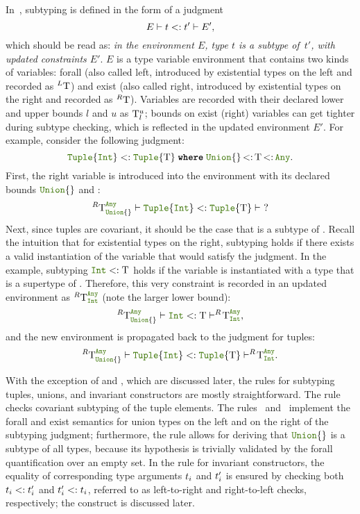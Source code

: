 In~, subtyping is defined in the form of a judgment
\[
  E \vdash t <: t' \vdash E',
\]
which should be read as:
\emph{in the environment $E$, type $t$ is a subtype of~$t'$,
with updated constraints $E'$}.
$E$ is a type variable environment that contains two kinds of variables:
forall (also called left, introduced by existential types on the left
and recorded as $^L \mathrm{T}$) and exist (also called right, introduced by 
existential types on the right and recorded as $^R \mathrm{T}$).
Variables are recorded with their declared lower and upper bounds $l$ and $u$
as $\mathrm{T}_l^u$; bounds on exist (right) variables can get tighter during subtype
checking, which is reflected in the updated environment $E'$.
For example, consider the following judgment:
\[ 
  \tupletyp{\inttyp} <: \wheret{\tupletyp{\T}}{\uniontyp{}\,{<:}\,\T\,{<:}\,\anytyp}.
\]
First, the right variable \T is introduced into the environment with its
declared bounds $\uniontyp{}$ and \anytyp:
\[ 
  ^R \T_{\uniontyp{}}^{\anytyp} \vdash \tupletyp{\inttyp} <: \tupletyp{\T} \vdash\ ?
\]
Next, since tuples are covariant, it should be the case that \inttyp is
a subtype of \T.
Recall the intuition that for existential types on the right,
subtyping holds if there exists a valid instantiation of the variable
that would satisfy the judgment.
In the example, subtyping $\inttyp <: \T$ holds if the variable \T is
instantiated with a type that is a supertype of \inttyp. Therefore, this very
constraint is recorded in an updated environment as $^R \T_{\inttyp}^{\anytyp}$
(note the larger lower bound):
\[ 
  ^R \T_{\uniontyp{}}^{\anytyp} \vdash \inttyp <: \T 
  \vdash ^R\!\T_{\inttyp}^{\anytyp},
\]
and the new environment is propagated back to the judgment for tuples:
\[ 
  ^R \T_{\uniontyp{}}^{\anytyp} \vdash \tupletyp{\inttyp} <: \tupletyp{\T}
  \vdash ^R\!\T_{\inttyp}^{\anytyp}.
\]

With the exception of  and ,
which are discussed later,
the rules for subtyping tuples, unions, and invariant constructors are
mostly straightforward.
The rule~ checks covariant subtyping of the tuple elements.
The rules~ and~
implement the forall and exist semantics for union types on the left
and on the right of the subtyping judgment;
furthermore, the rule  allows for
deriving that \(\uniontyp{}\) is a subtype of all
types, because its hypothesis is trivially validated by the forall
quantification over an empty set.
In the rule  for invariant constructors,
the equality of corresponding type arguments $t_i$ and $t'_i$ is
ensured by checking both $t_i <: t'_i$ and $t'_i <: t_i$,
referred to as left-to-right and right-to-left checks, respectively;
the \Barrier construct is discussed later.

